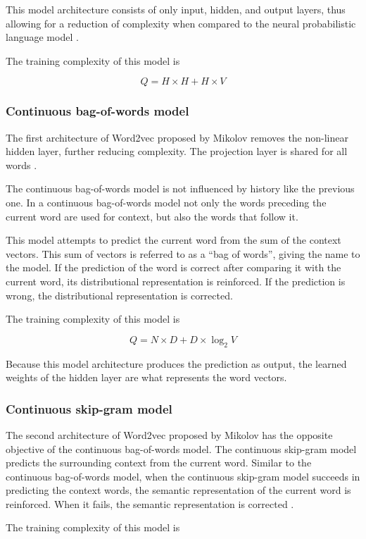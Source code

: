 \documentclass[14pt, a4paper]{extreport}
\begin{document}
This model architecture consists of only input, hidden, and output layers, thus allowing for a reduction of complexity when compared to the neural probabilistic language model \parencite{mikolov}.

The training complexity of this model is

\[Q = H \times H + H \times V\]
      \subsubsection{Continuous bag-of-words model}
The first architecture of Word2vec proposed by Mikolov removes the non-linear hidden layer, further reducing complexity. The projection layer is shared for all words \parencite{mikolov}.

The continuous bag-of-words model is not influenced by history like the previous one. In a continuous bag-of-words model not only the words preceding the current word are used for context, but also the words that follow it.

This model attempts to predict the current word from the sum of the context vectors. This sum of vectors is referred to as a ``bag of words'', giving the name to the model. If the prediction of the word is correct after comparing it with the current word, its distributional representation is reinforced. If the prediction is wrong, the distributional representation is corrected.

The training complexity of this model is

\[Q = N \times D + D \times \log_2{V}\]

Because this model architecture produces the prediction as output, the learned weights of the hidden layer are what represents the word vectors.
      \subsubsection{Continuous skip-gram model}
The second architecture of Word2vec proposed by Mikolov has the opposite objective of the continuous bag-of-words model. The continuous skip-gram model predicts the surrounding context from the current word. Similar to the continuous bag-of-words model, when the continuous skip-gram model succeeds in predicting the context words, the semantic representation of the current word is reinforced. When it fails, the semantic representation is corrected \parencite{mikolov}.

The training complexity of this model is
\end{document}
